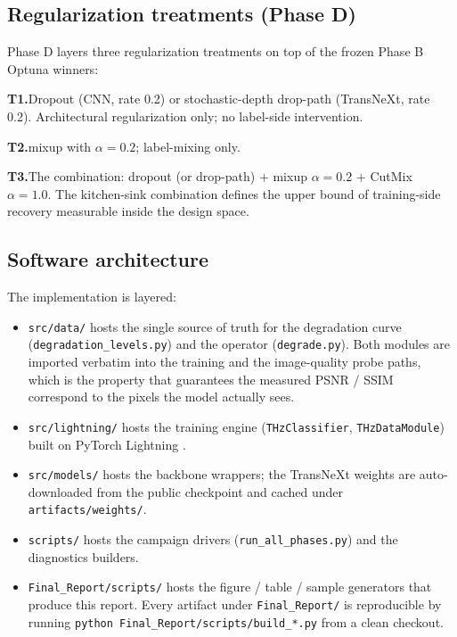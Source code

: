 \subsection{Regularization treatments (Phase D)}
\label{sec:design:phase_d}

Phase D layers three regularization treatments on top of the frozen
Phase B Optuna winners:

\textbf{T1.}\quad Dropout (CNN, rate 0.2) or stochastic-depth drop-path
\cite{huang2016stochastic} (TransNeXt, rate 0.2). Architectural regularization
only; no label-side intervention.

\textbf{T2.}\quad mixup \cite{zhang2018mixup} with $\alpha = 0.2$;
label-mixing only.

\textbf{T3.}\quad The combination: dropout (or drop-path)
$+$ mixup $\alpha = 0.2$ $+$ CutMix \cite{yun2019cutmix} $\alpha = 1.0$.
The kitchen-sink combination defines the upper bound of training-side
recovery measurable inside the design space.

\subsection{Software architecture}
\label{sec:design:sw}

The implementation is layered:

\begin{itemize}
  \item \texttt{src/data/} hosts the single source of truth for the
        degradation curve (\texttt{degradation\_levels.py}) and the operator
        (\texttt{degrade.py}). Both modules are imported verbatim into the
        training and the image-quality probe paths, which is the property
        that guarantees the measured PSNR / SSIM correspond to the pixels
        the model actually sees.
  \item \texttt{src/lightning/} hosts the training engine
        (\texttt{THzClassifier}, \texttt{THzDataModule}) built on PyTorch
        Lightning \cite{falcon2019lightning}.
  \item \texttt{src/models/} hosts the backbone wrappers; the TransNeXt
        weights are auto-downloaded from the public checkpoint and cached
        under \texttt{artifacts/weights/}.
  \item \texttt{scripts/} hosts the campaign drivers
        (\texttt{run\_all\_phases.py}) and the diagnostics builders.
  \item \texttt{Final\_Report/scripts/} hosts the figure / table / sample
        generators that produce this report. Every artifact under
        \texttt{Final\_Report/} is reproducible by running
        \texttt{python Final\_Report/scripts/build\_*.py} from a clean
        checkout.
\end{itemize}
